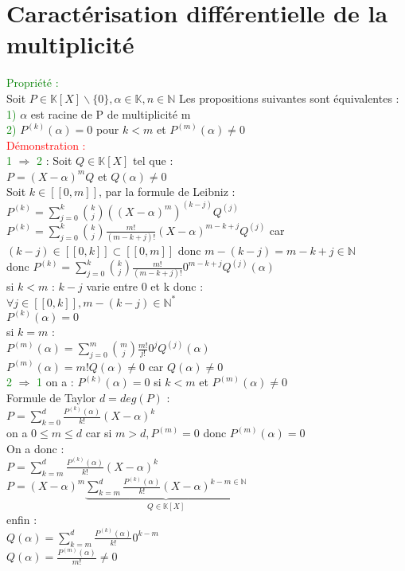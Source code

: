 \documentclass{article}
\begin{document}
\section{Caractérisation différentielle de la multiplicité}
\textcolor{green}{Propriété :} \\
Soit $P \in \mathbb K [X] \backslash \lbrace 0 \rbrace, \alpha \in \mathbb K, n \in \mathbb N$ Les propositions suivantes sont équivalentes : \\
\textcolor{green}{1)} $\alpha$ est racine de P de multiplicité m \\
\textcolor{green}{2)} $P^{(k)}(\alpha)=0$ pour $k<m$ et $P^{(m)}(\alpha)\neq 0$ \\
\textcolor{red}{Démonstration :} \\
\textcolor{green}{1} $\Rightarrow$ \textcolor{green}{2} : Soit $Q \in \mathbb K [X]$ tel que : \\
$P=(X-\alpha)^mQ$ et $Q(\alpha)\neq0$ \\
Soit $k\in [[0,m]]$, par la formule de Leibniz : \\
$P^{(k)}=\sum_{j=0}^k \binom{k}{j}((X- \alpha)^m)^{(k-j)}Q^{(j)}$ \\
$P^{(k)}=\sum_{j=0}^k \binom{k}{j} \frac{m!}{(m-k+j)!}(X- \alpha)^{m-k+j}Q^{(j)}$ car $(k-j) \in [[0,k]] \subset [[0,m]]$ donc $m-(k-j)=m-k+j \in \mathbb N$ \\
donc $P^{(k)}=\sum_{j=0}^k \binom{k}{j} \frac{m!}{(m-k+j)!}0^{m-k+j}Q^{(j)}(\alpha)$ \\
si $k<m$ : $k-j$ varie entre 0 et k donc : \\
$\forall j \in [[0,k]], m-(k-j) \in \mathbb N^*$ \\
$P^{(k)}(\alpha)=0$ \\
si $k=m$ : \\
$P^{(m)}(\alpha)=\sum_{j=0}^m \binom{m}{j} \frac{m!}{j!}0^j Q^{(j)}(\alpha)$ \\
$P^{(m)}(\alpha)=m! Q(\alpha) \neq 0$ car $Q(\alpha) \neq 0$ \\
\textcolor{green}{2} $\Rightarrow$ \textcolor{green}{1} on a : $P^{(k)}(\alpha)=0$ si $k<m$ et $P^{(m)}(\alpha)\neq 0$ \\
Formule de Taylor $d=deg(P)$ : \\
$P=\sum_{k=0}^d \frac{P^{(k)}(\alpha)}{k!}(X-\alpha)^k$ \\
on a $0 \leq m \leq d$ car si $m>d,P^{(m)}=0$ donc $P^{(m)}(\alpha)=0$ \\
On a donc : \\
$P=\sum_{k=m}^d \frac{P^{(k)}(\alpha)}{k!}(X-\alpha)^k$ \\
$P=(X-\alpha)^m\underbrace{\sum_{k=m}^d \frac{P^{(k)}(\alpha)}{k!}(X-\alpha)^{k-m \in \mathbb N}}_{Q \in \mathbb K[X]}$ \\
enfin : \\
$Q(\alpha)=\sum_{k=m}^d\frac{P^{(k)}(\alpha)}{k!}0^{k-m} $ \\
$Q(\alpha)=\frac{P^{(m)}(\alpha)}{m!} \neq 0$
\end{document}
